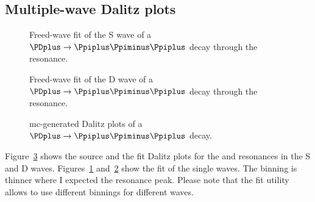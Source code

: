 \subsection{Multiple-wave Dalitz plots}

    \begin{figure}
        \centering

        \subfloat[][\label{fig:f0_phase_fit}]{}

        \subfloat[][]{}

        \caption{Freed-wave fit of the S wave of a $\PDplus \to \Ppiplus\Ppiminus\Ppiplus$ decay through the \Pfnez{} resonance.} 
        \label{fig:f0_f2:f0_fit}
    \end{figure}
    \begin{figure}
        \centering



        \caption{Freed-wave fit of the D wave of a $\PDplus \to \Ppiplus\Ppiminus\Ppiplus$ decay through the \Pfii{} resonance.}
        \label{fig:f0_f2:f2_fit}
    \end{figure}
    \begin{figure}
        \centering

        \caption{\ac{mc}-generated Dalitz plots of a $\PDplus \to \Ppiplus\Ppiminus\Ppiplus$ decay.}
        \label{fig:f0_f2_dalitz}
    \end{figure}
    Figure~\ref{fig:f0_f2_dalitz} shows the source and the fit Dalitz plots for the \Pfnez{} and \Pfii{} resonances in the S and D waves.
    Figures~\ref{fig:f0_f2:f0_fit} and~\ref{fig:f0_f2:f2_fit} show the fit of the single waves.
    The binning is thinner where I expected the resonance peak.
    Please note that the fit utility allows to use different binnings for different waves.


